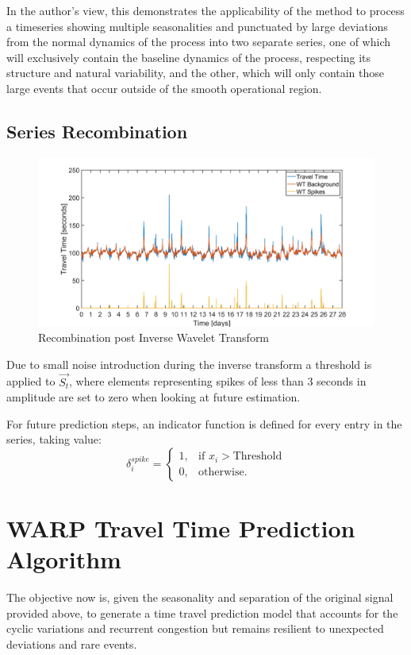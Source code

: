\documentclass[a4paper, 10pt, conference]{ieeeconf}      %
\begin{document}
In the author's view, this demonstrates the applicability of the method to process a timeseries showing multiple seasonalities and punctuated by large deviations from the normal dynamics of the process into two separate series, one of which will exclusively contain the baseline dynamics of the process, respecting its structure and natural variability, and the other, which will only contain those large events that occur outside of the smooth operational region.
\subsection{Series Recombination}
\begin{figure}[htbp]
	\centerline{\includegraphics[width=\linewidth]{./images/Splitting.png}}
	\caption{Recombination post Inverse Wavelet Transform}
	\label{fig:splitting}
\end{figure}
Due to small noise introduction during the inverse transform a threshold is applied to $\vec{S_t}$, where elements representing spikes of less than 3 seconds in amplitude are set to zero when looking at future estimation.

For future prediction steps, an indicator function is defined for every entry in the series, taking value:
\begin{equation}
    \delta_i^{spike}=
    \begin{cases}
      1, & \text{if } x_i > \text{Threshold}\\
      0, & \text{otherwise.}
    \end{cases}
    \label{delta}
  \end{equation}
\section{WARP Travel Time Prediction Algorithm} \label{algorithm}
The objective now is, given the seasonality and separation of the original signal provided above, to generate a time travel prediction model that accounts for the cyclic variations and recurrent congestion but remains resilient to unexpected deviations and rare events.
\end{document}
